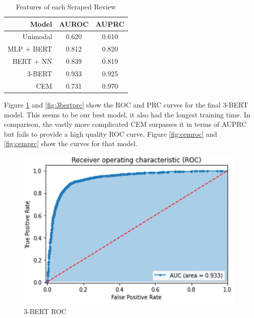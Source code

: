 \documentclass[utf8x]{ctexart}
\begin{document}
\begin{table}[ht]
  \centering
  \caption{Features of each Scraped Review}
  \label{tab:results}
  \begin{tabular}{r|cc}
    Model      & AUROC & AUPRC \\
    \hline
    Unimodal   & 0.620 & 0.610 \\
    MLP + BERT & 0.812 & 0.820 \\
    BERT + NN  & 0.839 & 0.819 \\
    3-BERT     & 0.933 & 0.925 \\
    CEM        & 0.731 & 0.970 \\
  \end{tabular}
\end{table}

Figure \ref{fig:3bertroc} and \ref{fig:3bertprc} show the ROC and PRC curves for the final 3-BERT model. This seems to be our best model, it also had the longest training time. In comparison, the vastly more complicated CEM surpasses it in terms of AUPRC but fails to provide a high quality ROC curve. Figure \ref{fig:cemroc} and \ref{fig:cemprc} show the curves for that model.

\begin{figure}[htb]
  \centering
  \includegraphics[width=\linewidth]{./3bertroc.png}
  \caption{3-BERT ROC}
  \label{fig:3bertroc}
\end{figure}
\end{document}
